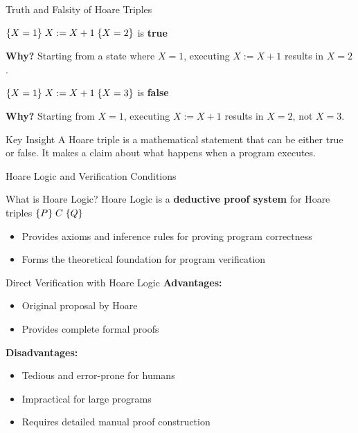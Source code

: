 \begin{frame}{Truth and Falsity of Hoare Triples}
    \begin{example}
        $\{X = 1\}\; X := X + 1\; \{X = 2\}$ is \textbf{true}
        
        \textbf{Why?} Starting from a state where $X = 1$, executing $X := X + 1$ results in $X = 2$.
    \end{example}
    
    \begin{example}
        $\{X = 1\}\; X := X + 1\; \{X = 3\}$ is \textbf{false}
        
        \textbf{Why?} Starting from $X = 1$, executing $X := X + 1$ results in $X = 2$, not $X = 3$.
    \end{example}
    
    \begin{alertblock}{Key Insight}
        A Hoare triple is a mathematical statement that can be either true or false. It makes a claim about what happens when a program executes.
    \end{alertblock}
\end{frame}

\begin{frame}{Hoare Logic and Verification Conditions}
    \begin{block}{What is Hoare Logic?}
        Hoare Logic is a \textbf{deductive proof system} for Hoare triples $\{P\}\; C\; \{Q\}$
        \begin{itemize}
            \item Provides axioms and inference rules for proving program correctness
            \item Forms the theoretical foundation for program verification
        \end{itemize}
    \end{block}
    
    \begin{block}{Direct Verification with Hoare Logic}
        \textbf{Advantages:}
        \begin{itemize}
            \item Original proposal by Hoare
            \item Provides complete formal proofs
        \end{itemize}
        
        \textbf{Disadvantages:}
        \begin{itemize}
            \item Tedious and error-prone for humans
            \item Impractical for large programs
            \item Requires detailed manual proof construction
        \end{itemize}
    \end{block}
\end{frame}

